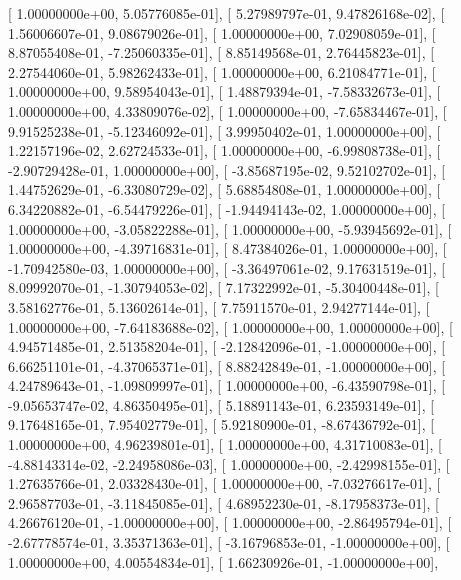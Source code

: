 \documentclass{article}
\begin{document}
       [  1.00000000e+00,   5.05776085e-01],
       [  5.27989797e-01,   9.47826168e-02],
       [  1.56006607e-01,   9.08679026e-01],
       [  1.00000000e+00,   7.02908059e-01],
       [  8.87055408e-01,  -7.25060335e-01],
       [  8.85149568e-01,   2.76445823e-01],
       [  2.27544060e-01,   5.98262433e-01],
       [  1.00000000e+00,   6.21084771e-01],
       [  1.00000000e+00,   9.58954043e-01],
       [  1.48879394e-01,  -7.58332673e-01],
       [  1.00000000e+00,   4.33809076e-02],
       [  1.00000000e+00,  -7.65834467e-01],
       [  9.91525238e-01,  -5.12346092e-01],
       [  3.99950402e-01,   1.00000000e+00],
       [  1.22157196e-02,   2.62724533e-01],
       [  1.00000000e+00,  -6.99808738e-01],
       [ -2.90729428e-01,   1.00000000e+00],
       [ -3.85687195e-02,   9.52102702e-01],
       [  1.44752629e-01,  -6.33080729e-02],
       [  5.68854808e-01,   1.00000000e+00],
       [  6.34220882e-01,  -6.54479226e-01],
       [ -1.94494143e-02,   1.00000000e+00],
       [  1.00000000e+00,  -3.05822288e-01],
       [  1.00000000e+00,  -5.93945692e-01],
       [  1.00000000e+00,  -4.39716831e-01],
       [  8.47384026e-01,   1.00000000e+00],
       [ -1.70942580e-03,   1.00000000e+00],
       [ -3.36497061e-02,   9.17631519e-01],
       [  8.09992070e-01,  -1.30794053e-02],
       [  7.17322992e-01,  -5.30400448e-01],
       [  3.58162776e-01,   5.13602614e-01],
       [  7.75911570e-01,   2.94277144e-01],
       [  1.00000000e+00,  -7.64183688e-02],
       [  1.00000000e+00,   1.00000000e+00],
       [  4.94571485e-01,   2.51358204e-01],
       [ -2.12842096e-01,  -1.00000000e+00],
       [  6.66251101e-01,  -4.37065371e-01],
       [  8.88242849e-01,  -1.00000000e+00],
       [  4.24789643e-01,  -1.09809997e-01],
       [  1.00000000e+00,  -6.43590798e-01],
       [ -9.05653747e-02,   4.86350495e-01],
       [  5.18891143e-01,   6.23593149e-01],
       [  9.17648165e-01,   7.95402779e-01],
       [  5.92180900e-01,  -8.67436792e-01],
       [  1.00000000e+00,   4.96239801e-01],
       [  1.00000000e+00,   4.31710083e-01],
       [ -4.88143314e-02,  -2.24958086e-03],
       [  1.00000000e+00,  -2.42998155e-01],
       [  1.27635766e-01,   2.03328430e-01],
       [  1.00000000e+00,  -7.03276617e-01],
       [  2.96587703e-01,  -3.11845085e-01],
       [  4.68952230e-01,  -8.17958373e-01],
       [  4.26676120e-01,  -1.00000000e+00],
       [  1.00000000e+00,  -2.86495794e-01],
       [ -2.67778574e-01,   3.35371363e-01],
       [ -3.16796853e-01,  -1.00000000e+00],
       [  1.00000000e+00,   4.00554834e-01],
       [  1.66230926e-01,  -1.00000000e+00],
\end{document}

